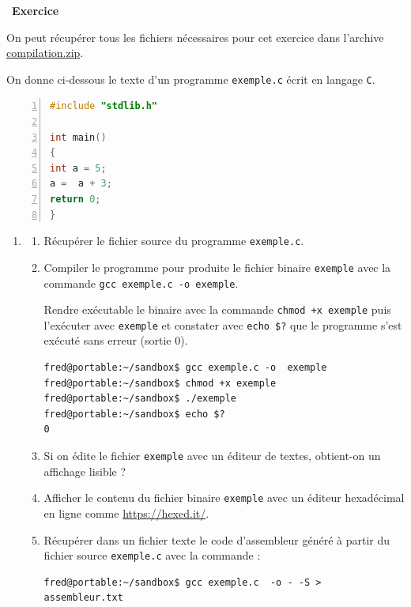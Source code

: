 \documentclass[a4paper, french, 11pt]{article}  %
\newcounter{exercice}
\newenvironment{exercice}[1]
{\par \medskip   \addtocounter{exercice}{1} \noindent  
\begin{bclogo}[arrondi =0.1,   noborder = true, logo=\bccrayon, marge=4]{~\textbf{Exercice} \textbf{\theexercice} {\itshape #1} }  \par}
{
\end{bclogo}
 \par \bigskip }
\newcounter{prog}
\begin{document}
\begin{exercice}{}

On peut récupérer tous les fichiers nécessaires pour cet exercice dans l'archive \href{}{compilation.zip}.

On donne ci-dessous le texte d'un programme \texttt{exemple.c} écrit  en langage \texttt{C}.

\begin{lstlisting}[language=C,numbers=left]
#include "stdlib.h"

int main()
{
int a = 5;
a =  a + 3;
return 0;
} 
\end{lstlisting}

\begin{enumerate}

\item 

\begin{enumerate}
	\item Récupérer le fichier source du programme \texttt{exemple.c}.
	\item Compiler le programme pour produite le fichier binaire \texttt{exemple} avec la commande \texttt{gcc exemple.c -o exemple}.
	
Rendre exécutable le binaire avec la commande \texttt{chmod +x exemple} puis l'exécuter avec \texttt{exemple} et constater avec \verb+echo $?+ que le programme s'est exécuté sans erreur (sortie $0$).

\begin{lstlisting}[style=compil]
fred@portable:~/sandbox$ gcc exemple.c -o  exemple
fred@portable:~/sandbox$ chmod +x exemple
fred@portable:~/sandbox$ ./exemple 
fred@portable:~/sandbox$ echo $?
0
\end{lstlisting}

	\item Si on édite le fichier \texttt{exemple} avec un éditeur de textes, obtient-on un affichage lisible ?
	\item Afficher le contenu du fichier binaire \texttt{exemple} avec un éditeur hexadécimal en ligne comme \url{https://hexed.it/}.
	
	\item Récupérer dans un fichier texte le code d'assembleur généré à partir du  fichier source \texttt{exemple.c} avec la commande :

\begin{lstlisting}[style=compil]
fred@portable:~/sandbox$ gcc exemple.c  -o - -S > assembleur.txt
\end{lstlisting}


\end{enumerate}
\end{enumerate}
\end{exercice}
\end{document}
